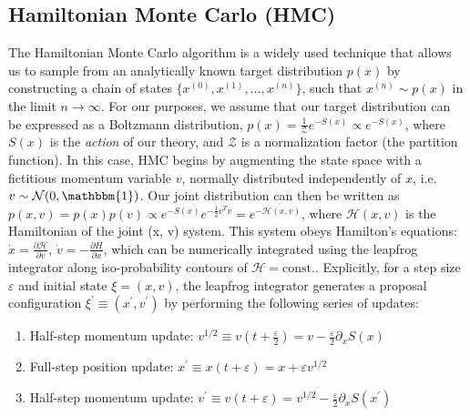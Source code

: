 \documentclass{article} %
\begin{document}
\subsection{\label{subsec:HMC}Hamiltonian Monte Carlo (HMC)}
%
The Hamiltonian Monte Carlo algorithm is a widely used technique that allows us to sample from an analytically known
target distribution \(p(x)\) by constructing a chain of states \(\{x^{(0)}, x^{(1)}, \ldots, x^{(n)}\}\), such that
\(x^{(n)}\sim p(x)\) in the limit \(n\rightarrow\infty\).
%
For our purposes, we assume that our target distribution can be expressed as a Boltzmann distribution, \(p(x) =
\tfrac{1}{\mathcal{Z}} e^{-S(x)}\propto e^{-S(x)}\), where \(S(x)\) is the \emph{action} of our theory, and
\(\mathcal{Z}\) is a normalization factor (the partition function).
%
In this case, HMC begins by augmenting the state space with a fictitious momentum variable \(v\), normally
distributed independently of \(x\), i.e.\ \(v\sim\mathcal{N}(0, \mathbbm{1})\).
%
Our joint distribution can then be written as \(%
   p(x, v) = p(x) p(v) \propto e^{-S(x)} e^{-\frac{1}{2}v^{T}v} = e^{-\mathcal{H}(x, v)}
\), where \(\mathcal{H}(x, v)\) is the Hamiltonian of the joint (x, v) system.
%
This system obeys Hamilton's equations: %
\(\dot{x} = \frac{\partial\mathcal{H}}{\partial v}\), \(\dot{v} = -\frac{\partial H}{\partial x}\), which can be 
numerically integrated using the leapfrog integrator along iso-probability contours of \(\mathcal{H} = \text{const.}\).
%
Explicitly, for a step size \(\varepsilon\) and initial state \(\xi = (x, v)\), the leapfrog integrator generates a
proposal configuration \(\xi^{\prime} \equiv (x^{\prime}, v^{\prime})\) by performing the following series of updates: 
%
%
\begin{enumerate}
   \item Half-step momentum update: \hspace{12pt}\(%
      v^{1/2} \equiv v{\left(t+\frac{\varepsilon}{2}\right)} = v-\frac{\varepsilon}{2}\partial_{x}S(x)
   \)
   \item Full-step position update: \hspace{36pt}\(%
      x^{\prime} \equiv x(t+\varepsilon) = x + \varepsilon v^{1/2}
   \)
   \item Half-step momentum update:
      \hspace{18pt} \(%
         v^{\prime} \equiv v(t+\varepsilon) = v^{1/2} - \frac{\varepsilon}{2}\partial_{x} S(x^{\prime})
   \)
\end{enumerate}
\end{document}
